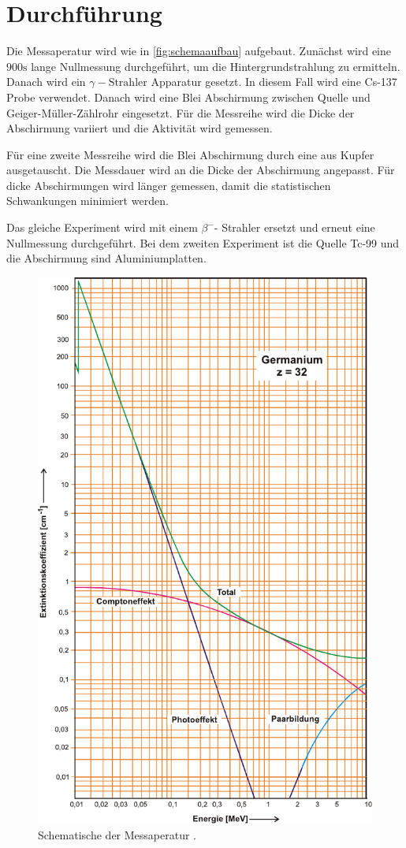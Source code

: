 \section{Durchführung}
\label{sec:Durchführung}
Die Messaperatur wird wie in \autoref{fig:schemaaufbau} aufgebaut. Zunächst wird eine $900 \unit{\second}$ lange Nullmessung durchgeführt, um die Hintergrundstrahlung zu ermitteln.
Danach wird ein $\gamma- \text{Strahler}$ Apparatur gesetzt. In diesem Fall wird eine Cs-137 Probe verwendet. Danach wird eine Blei Abschirmung zwischen Quelle und Geiger-Müller-Zählrohr eingesetzt. Für die Messreihe wird die Dicke der Abschirmung variiert und die Aktivität wird gemessen.

Für eine zweite Messreihe wird die Blei Abschirmung durch eine aus Kupfer ausgetauscht. Die Messdauer wird an die Dicke der Abschirmung angepasst. Für dicke Abschirmungen wird länger gemessen, damit die statistischen Schwankungen minimiert werden.

Das gleiche Experiment wird mit einem $\beta^{-}$- Strahler ersetzt und erneut eine Nullmessung durchgeführt. Bei dem zweiten Experiment ist die Quelle Tc-99 und die Abschirmung sind Aluminiumplatten.


\begin{figure}[h]
    \centering
    \includegraphics{figures/abb4.pdf}
    \caption{Schematische der Messaperatur \cite{ap04}.} 
    \label{fig:schemaaufbau}
\end{figure}
